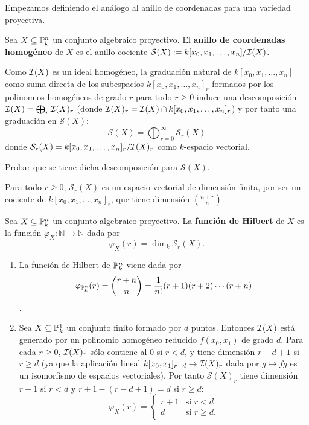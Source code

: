 \documentclass[ACGA.tex]{subfiles}
\begin{document}
Empezamos definiendo el análogo al anillo de coordenadas para una variedad proyectiva.

\begin{defi}
 Sea $X\subseteq\mathbb{P}^n_k$ un conjunto algebraico proyectivo. El {\bf anillo de coordenadas homogéneo} de $X$ es el anillo cociente ${\mathcal S}(X):=k[x_0,x_1,\ldots,x_n]/\mathcal{I}(X)$.
\end{defi}

Como $\mathcal{I}(X)$ es un ideal homogéneo, la graduación natural de $k[x_0,x_1,\ldots,x_n]$ como suma directa de los subespacios $k[x_0,x_1,\ldots,x_n]_r$ formados por los polinomios homogéneos de grado $r$ para todo $r\geq 0$ induce una descomposición $\mathcal{I}(X)=\bigoplus_r\mathcal{I}(X)_r$ (donde $\mathcal{I}(X)_r=\mathcal{I}(X)\cap k[x_0,x_1,\ldots,x_n]_r$) y por tanto una graduación en ${\mathcal S}(X)$:
$$
{\mathcal S}(X)=\bigoplus_{r=0}^{\infty}{\mathcal S}_r(X)
$$
donde ${\mathcal S}_r(X)=k[x_0,x_1,\ldots,x_n]_r/\mathcal{I}(X)_r$ como $k$-espacio vectorial.

\begin{ejer}
 Probar que se tiene dicha descomposición para ${\mathcal S}(X)$.
\end{ejer}

Para todo $r\geq 0$, ${\mathcal S}_r(X)$ es un espacio vectorial de dimensión finita, por ser un cociente de $k[x_0,x_1,\ldots,x_n]_r$, que tiene dimensión ${{n+r}\choose n}$.

\begin{defi}
 Sea $X\subseteq\mathbb{P}^n_k$ un conjunto algebraico proyectivo. La {\bf función de Hilbert} de $X$ es la función $\varphi_X:{\mathbb N}\to{\mathbb N}$ dada por
$$
\varphi_X(r)=\dim_k{\mathcal S}_r(X).
$$
\end{defi}

\begin{ejs}\label{hilbert}
\begin{enumerate}
        \item La función de Hilbert de $\mathbb{P}^n_k$ viene dada por $$\varphi_{\mathbb{P}^n_k}(r)={{r+n}\choose n}=\frac{1}{n!}(r+1)(r+2)\cdots(r+n)$$.
\item Sea $X\subseteq\mathbb{P}^1_k$ un conjunto finito formado por $d$ puntos. Entonces $\mathcal{I}(X)$ está generado por un polinomio homogéneo reducido $f(x_0,x_1)$ de grado $d$. Para cada $r\geq 0$, $\mathcal{I}(X)_r$ sólo contiene al $0$ si $r<d$, y tiene dimensión $r-d+1$ si $r\geq d$ (ya que la aplicación lineal $k[x_0,x_1]_{r-d}\to\mathcal{I}(X)_r$ dada por $g\mapsto fg$ es un isomorfismo de espacios vectoriales). Por tanto ${\mathcal S}(X)_r$ tiene dimensión $r+1$ si $r<d$ y $r+1-(r-d+1)=d$ si $r\geq d$:
$$
\varphi_X(r)=\left\{\begin{array}{ll}
                     r+1 & \text{si }r<d \\
                     d & \text{si }r\geq d.
                    \end{array}\right.
$$

\end{enumerate}
\end{ejs}
\end{document}
